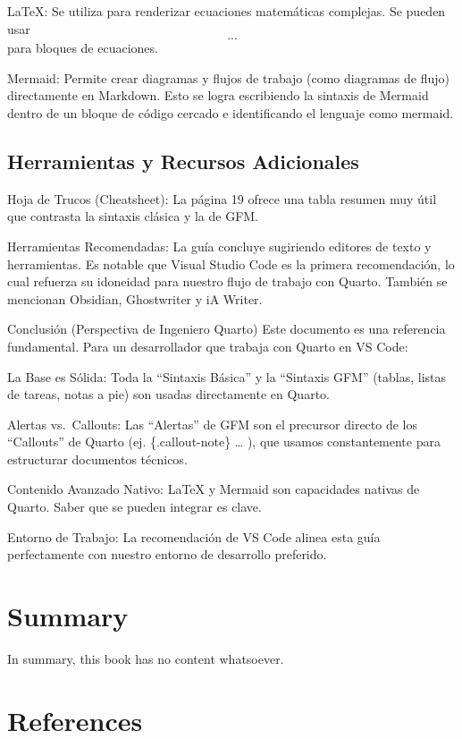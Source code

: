 \documentclass[
  letterpaper,
  DIV=11,
  numbers=noendperiod]{scrreprt}
\begin{document}
LaTeX: Se utiliza para renderizar ecuaciones matemáticas complejas. Se
pueden usar \[...\] para bloques de ecuaciones.

Mermaid: Permite crear diagramas y flujos de trabajo (como diagramas de
flujo) directamente en Markdown. Esto se logra escribiendo la sintaxis
de Mermaid dentro de un bloque de código cercado e identificando el
lenguaje como mermaid.

\section{Herramientas y Recursos
Adicionales}\label{herramientas-y-recursos-adicionales}

Hoja de Trucos (Cheatsheet): La página 19 ofrece una tabla resumen muy
útil que contrasta la sintaxis clásica y la de GFM.

Herramientas Recomendadas: La guía concluye sugiriendo editores de texto
y herramientas. Es notable que Visual Studio Code es la primera
recomendación, lo cual refuerza su idoneidad para nuestro flujo de
trabajo con Quarto. También se mencionan Obsidian, Ghostwriter y iA
Writer.

Conclusión (Perspectiva de Ingeniero Quarto) Este documento es una
referencia fundamental. Para un desarrollador que trabaja con Quarto en
VS Code:

La Base es Sólida: Toda la ``Sintaxis Básica'' y la ``Sintaxis GFM''
(tablas, listas de tareas, notas a pie) son usadas directamente en
Quarto.

Alertas vs.~Callouts: Las ``Alertas'' de GFM son el precursor directo de
los ``Callouts'' de Quarto (ej. \{.callout-note\} \ldots{} ), que usamos
constantemente para estructurar documentos técnicos.

Contenido Avanzado Nativo: LaTeX y Mermaid son capacidades nativas de
Quarto. Saber que se pueden integrar es clave.

Entorno de Trabajo: La recomendación de VS Code alinea esta guía
perfectamente con nuestro entorno de desarrollo preferido.


\chapter{Summary}\label{summary}

In summary, this book has no content whatsoever.


\chapter*{References}\label{references}


\label{refs}
\end{document}

